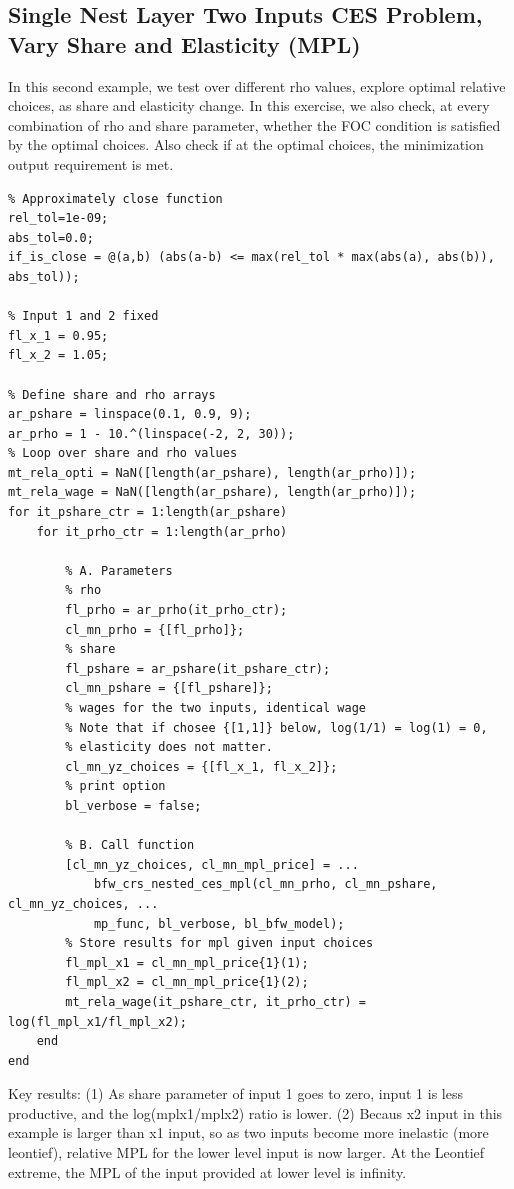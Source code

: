 \documentclass[
]{book}
\begin{document}
\hypertarget{single-nest-layer-two-inputs-ces-problem-vary-share-and-elasticity-mpl}{%
\subsection{Single Nest Layer Two Inputs CES Problem, Vary Share and Elasticity (MPL)}\label{single-nest-layer-two-inputs-ces-problem-vary-share-and-elasticity-mpl}}

In this second example, we test over different rho values, explore
optimal relative choices, as share and elasticity change. In this
exercise, we also check, at every combination of rho and share
parameter, whether the FOC condition is satisfied by the optimal
choices. Also check if at the optimal choices, the minimization output
requirement is met.

\begin{verbatim}
% Approximately close function
rel_tol=1e-09;
abs_tol=0.0;
if_is_close = @(a,b) (abs(a-b) <= max(rel_tol * max(abs(a), abs(b)), abs_tol));

% Input 1 and 2 fixed
fl_x_1 = 0.95;
fl_x_2 = 1.05;

% Define share and rho arrays
ar_pshare = linspace(0.1, 0.9, 9);
ar_prho = 1 - 10.^(linspace(-2, 2, 30));
% Loop over share and rho values
mt_rela_opti = NaN([length(ar_pshare), length(ar_prho)]);
mt_rela_wage = NaN([length(ar_pshare), length(ar_prho)]);
for it_pshare_ctr = 1:length(ar_pshare)
    for it_prho_ctr = 1:length(ar_prho)

        % A. Parameters
        % rho
        fl_prho = ar_prho(it_prho_ctr);
        cl_mn_prho = {[fl_prho]};
        % share
        fl_pshare = ar_pshare(it_pshare_ctr);
        cl_mn_pshare = {[fl_pshare]};
        % wages for the two inputs, identical wage
        % Note that if chosee {[1,1]} below, log(1/1) = log(1) = 0,
        % elasticity does not matter. 
        cl_mn_yz_choices = {[fl_x_1, fl_x_2]};
        % print option
        bl_verbose = false;

        % B. Call function
        [cl_mn_yz_choices, cl_mn_mpl_price] = ...
            bfw_crs_nested_ces_mpl(cl_mn_prho, cl_mn_pshare, cl_mn_yz_choices, ...
            mp_func, bl_verbose, bl_bfw_model);
        % Store results for mpl given input choices
        fl_mpl_x1 = cl_mn_mpl_price{1}(1);
        fl_mpl_x2 = cl_mn_mpl_price{1}(2);
        mt_rela_wage(it_pshare_ctr, it_prho_ctr) = log(fl_mpl_x1/fl_mpl_x2);
    end
end
\end{verbatim}

Key results: (1) As share parameter of input 1 goes to zero, input 1 is
less productive, and the log(mplx1/mplx2) ratio is lower. (2) Becaus x2
input in this example is larger than x1 input, so as two inputs become
more inelastic (more leontief), relative MPL for the lower level input
is now larger. At the Leontief extreme, the MPL of the input provided at
lower level is infinity.
\end{document}
